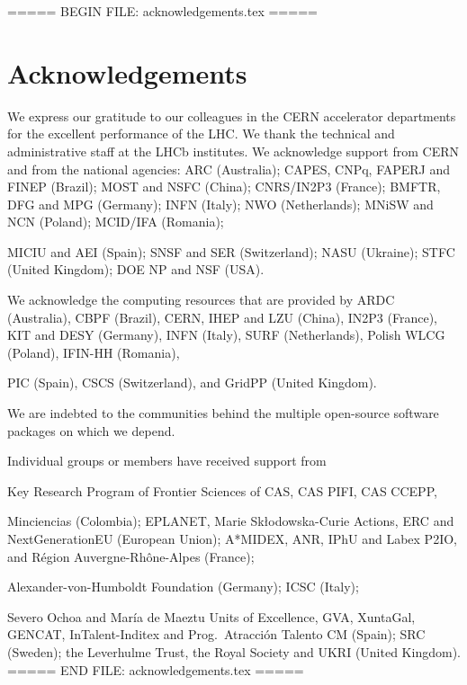 ===== BEGIN FILE: acknowledgements.tex =====
\section*{Acknowledgements}



\noindent We express our gratitude to our colleagues in the CERN
accelerator departments for the excellent performance of the LHC. We
thank the technical and administrative staff at the LHCb
institutes.
We acknowledge support from CERN and from the national agencies:
ARC (Australia);
CAPES, CNPq, FAPERJ and FINEP (Brazil);
MOST and NSFC (China);
CNRS/IN2P3 (France);
BMFTR, DFG and MPG (Germany);
INFN (Italy);
NWO (Netherlands);
MNiSW and NCN (Poland);
MCID/IFA (Romania);

MICIU and AEI (Spain);
SNSF and SER (Switzerland);
NASU (Ukraine);
STFC (United Kingdom);
DOE NP and NSF (USA).

We acknowledge the computing resources that are provided by ARDC (Australia),
CBPF (Brazil),
CERN,
IHEP and LZU (China),
IN2P3 (France),
KIT and DESY (Germany),
INFN (Italy),
SURF (Netherlands),
Polish WLCG (Poland),
IFIN-HH (Romania),

PIC (Spain), CSCS (Switzerland),
and GridPP (United Kingdom).

We are indebted to the communities behind the multiple open-source
software packages on which we depend.

Individual groups or members have received support from

Key Research Program of Frontier Sciences of CAS, CAS PIFI, CAS CCEPP,


Minciencias (Colombia);
EPLANET, Marie Sk\l{}odowska-Curie Actions, ERC and NextGenerationEU (European Union);
A*MIDEX, ANR, IPhU and Labex P2IO, and R\'{e}gion Auvergne-Rh\^{o}ne-Alpes (France);

Alexander-von-Humboldt Foundation (Germany);
ICSC (Italy);

Severo Ochoa and Mar\'ia de Maeztu Units of Excellence, GVA, XuntaGal, GENCAT, InTalent-Inditex and Prog.~Atracci\'on Talento CM (Spain);
SRC (Sweden);
the Leverhulme Trust, the Royal Society and UKRI (United Kingdom).
===== END FILE: acknowledgements.tex =====


